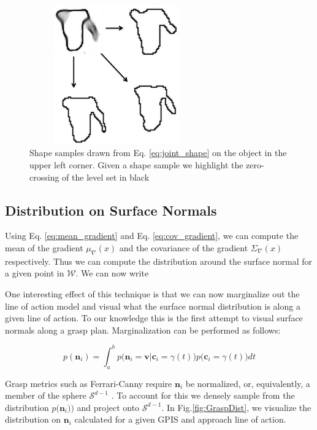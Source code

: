 \documentclass[journal,transmag]{IEEEtran}%
\begin{document}
\begin{figure}[ht!]
\centering
\includegraphics[width = 7.5cm, height= 6cm ]{figures/Slide13.jpg}
\caption{Shape samples drawn from Eq. \ref{eq:joint_shape} on the object in the upper left corner. Given a shape sample we highlight the zero-crossing of the level set in black}
\vspace*{-10pt}
\label{fig:shape_samples}
\end{figure}

\subsection{Distribution on Surface Normals}\label{sec:normals} 
Using Eq. \ref{eq:mean_gradient} and Eq. \ref{eq:cov_gradient}, we can compute the mean of the gradient $ \mu_{\nabla}(x)$ and the covariance of the gradient $\Sigma_{\nabla}(x)$ respectively. Thus we can compute the distribution around the surface normal for a given point in $\mathcal{W}$. We can now write 

One interesting effect of this technique is that we can now marginalize out the line of action model and visual what the surface normal distribution is along a given line of action. To our knowledge this is the first attempt to visual surface normals along a grasp plan. Marginalization can be performed as follows:

\vspace{-2ex}
\begin{equation}
    p(\textbf{n}_i ) = \int_a^b   p\big(\textbf{n}_i = \textbf{v} | \textbf{c}_i = \gamma(t) \big)p\big(\textbf{c}_i = \gamma(t)\big) dt \label{eq:normal_dist}
\end{equation}

Grasp metrics such as  Ferrari-Canny require $\textbf{n}_i$ be normalized, or, equivalently, a member of the sphere $\mathcal{S}^{d-1}$ \cite{ferrari1992}. To account for this we densely sample from the  distribution $p \big(\textbf{n}_i ) \big)$  and project onto $\mathcal{S}^{d-1}$.  In Fig.\ref{fig:GraspDist}, we visualize the distribution on $\textbf{n}_i$ calculated for a given GPIS and approach line of action.
\end{document}
